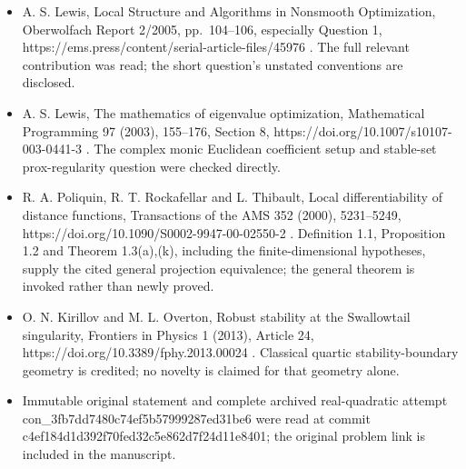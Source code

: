 \documentclass[11pt]{article}
\begin{document}
\begin{itemize}
\item
  A. S. Lewis, Local Structure and Algorithms in Nonsmooth Optimization, Oberwolfach Report 2/2005, pp.~104--106, especially Question 1, https://ems.press/content/serial-article-files/45976 . The full relevant contribution was read; the short question's unstated conventions are disclosed.
\item
  A. S. Lewis, The mathematics of eigenvalue optimization, Mathematical Programming 97 (2003), 155--176, Section 8, https://doi.org/10.1007/s10107-003-0441-3 . The complex monic Euclidean coefficient setup and stable-set prox-regularity question were checked directly.
\item
  R. A. Poliquin, R. T. Rockafellar and L. Thibault, Local differentiability of distance functions, Transactions of the AMS 352 (2000), 5231--5249, https://doi.org/10.1090/S0002-9947-00-02550-2 . Definition 1.1, Proposition 1.2 and Theorem 1.3(a),(k), including the finite-dimensional hypotheses, supply the cited general projection equivalence; the general theorem is invoked rather than newly proved.
\item
  O. N. Kirillov and M. L. Overton, Robust stability at the Swallowtail singularity, Frontiers in Physics 1 (2013), Article 24, https://doi.org/10.3389/fphy.2013.00024 . Classical quartic stability-boundary geometry is credited; no novelty is claimed for that geometry alone.
\item
  Immutable original statement and complete archived real-quadratic attempt con\_3fb7dd7480c74ef5b57999287ed31be6 were read at commit c4ef184d1d392f70fed32c5e862d7f24d11e8401; the original problem link is included in the manuscript.
\end{itemize}
\end{document}
